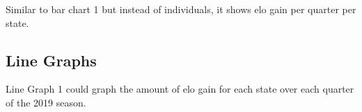 \documentclass[11pt, oneside, a4paper]{article}
\begin{document}
{{{%
\setlength{\fboxsep}{0pt}%
\setlength{\fboxrule}{1pt}%
%

Similar to bar chart 1 but instead of individuals, it shows elo gain per quarter per state.

\subsection*{Line Graphs}

{%
\setlength{\fboxsep}{0pt}%
\setlength{\fboxrule}{1pt}%
%

Line Graph 1 could graph the amount of elo gain for each state over each quarter of the 2019 season.

{%
\setlength{\fboxsep}{0pt}%
\setlength{\fboxrule}{1pt}%
%

}}}}}
\end{document}
